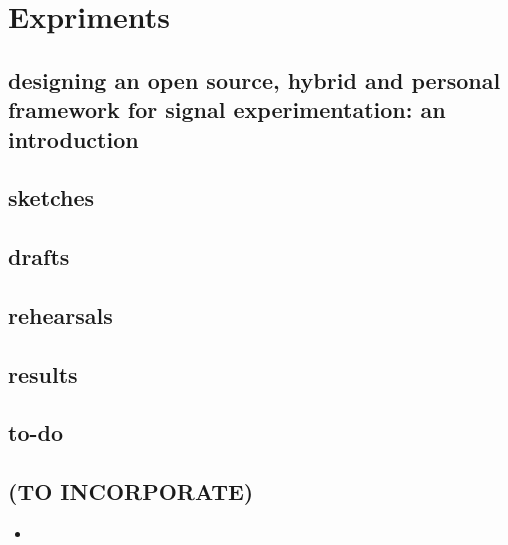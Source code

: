\chapter{Expriments}\label{experiments}
\section{designing an open source, hybrid and personal framework for signal experimentation: an introduction}

\section{sketches}

\section{drafts}

\section{rehearsals}

\section{results}

\section{to-do}

\begin{unsortedStuff}	
\section*{(TO INCORPORATE)}
	\begin{itemize}
		\item 
	\end{itemize}
\end{unsortedStuff}
		
\begin{optBlankSpace}
	\newpage
	\mbox{}
\end{optBlankSpace}

